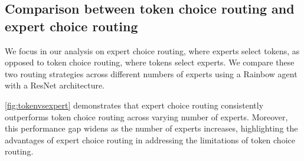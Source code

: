 \subsection{Comparison between token choice routing and expert choice routing}
\label{appendix_sec:expertChoicevsTokenChoice}

We focus in our analysis on expert choice routing, where experts select tokens, as opposed to token choice routing, where tokens select experts. We compare these two routing strategies across different numbers of experts using a Rainbow agent with a ResNet architecture.

\autoref{fig:tokenvsexpert} demonstrates that expert choice routing consistently outperforms token choice routing across varying number of experts.  Moreover, this performance gap widens as the number of experts increases, highlighting the advantages of expert choice routing in addressing the limitations of token choice routing.

